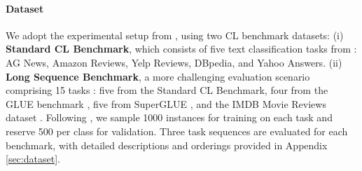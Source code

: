 \paragraph{Dataset} We adopt the experimental setup from \citet{du2024unlocking}, using two CL benchmark datasets:
(i) \textbf{Standard CL Benchmark}, which consists of five text classification tasks from \citet{zhang2015character}: AG News, Amazon Reviews, Yelp Reviews, DBpedia, and Yahoo Answers.
(ii) \textbf{Long Sequence Benchmark}, a more challenging evaluation scenario comprising 15 tasks \cite{razdaibiedina2023progressive}: five from the Standard CL Benchmark, four from the GLUE benchmark \cite{wang2018glue}, five from SuperGLUE \cite{wang2019superglue}, and the IMDB Movie Reviews dataset \cite{maas2011learning}.
Following \citet{wang2023orthogonal}, we sample 1000 instances for training on each task and reserve 500 per class for validation. Three task sequences are evaluated for each benchmark, with detailed descriptions and orderings provided in Appendix \ref{sec:dataset}.




